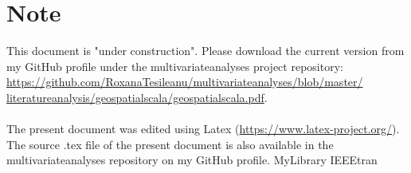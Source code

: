\documentclass {article}
\begin{document}
\section* {Note}
This document is "under construction". Please download the current version from  my GitHub profile under the multivariate\underline{\space}analyses project repository: \href{https://github.com/RoxanaTesileanu/multivariate_analyses/blob/master/literature_analysis/geospatial_scala/geospatial_scala.pdf}{https://github.com/RoxanaTesileanu/multivariate\underline{\space}analyses/blob/master/\\literature\underline{\space}analysis/geospatial\underline{\space}scala/geospatial\underline{\space}scala.pdf}. 
\\
\\
The present document was edited using Latex \cite{claudio_latex-tutorial.com_nodate} (\href{https://www.latex-project.org/}{https://www.latex-project.org/}). The source .tex file of the present document is also available in the multivariate\underline{\space}analyses repository on my GitHub profile.  
 {MyLibrary}
 {IEEEtran}
\end{document}
